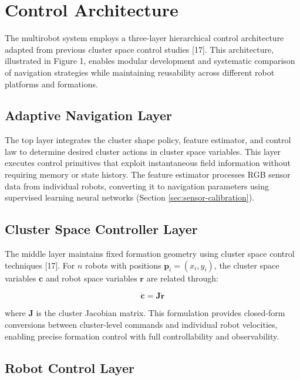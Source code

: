 \documentclass{article}
\begin{document}
\section{Control Architecture}

The multirobot system employs a three-layer hierarchical control architecture adapted from previous cluster space control studies [17]. This architecture, illustrated in Figure 1, enables modular development and systematic comparison of navigation strategies while maintaining reusability across different robot platforms and formations.

\subsection{Adaptive Navigation Layer}

The top layer integrates the cluster shape policy, feature estimator, and control law to determine desired cluster actions in cluster space variables. This layer executes control primitives that exploit instantaneous field information without requiring memory or state history. The feature estimator processes RGB sensor data from individual robots, converting it to navigation parameters using supervised learning neural networks (Section \ref{sec:sensor-calibration}).

\subsection{Cluster Space Controller Layer}

The middle layer maintains fixed formation geometry using cluster space control techniques [17]. For $n$ robots with positions $\mathbf{p}_i = (x_i, y_i)$, the cluster space variables $\mathbf{c}$ and robot space variables $\mathbf{r}$ are related through:

\begin{equation}
\dot{\mathbf{c}} = \mathbf{J}\dot{\mathbf{r}}
\end{equation}

where $\mathbf{J}$ is the cluster Jacobian matrix. This formulation provides closed-form conversions between cluster-level commands and individual robot velocities, enabling precise formation control with full controllability and observability.

\subsection{Robot Control Layer}
\end{document}
